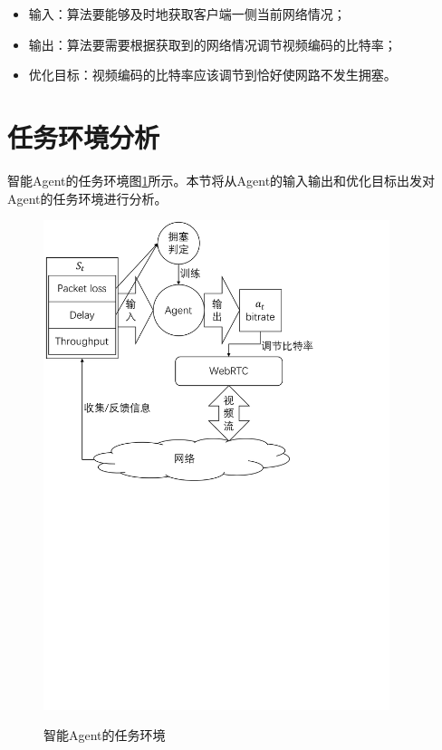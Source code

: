 \documentclass[a4paper]{ctexart}
\begin{document}
\begin{itemize}
	\item 输入：算法要能够及时地获取客户端一侧当前网络情况；
	\item 输出：算法要需要根据获取到的网络情况调节视频编码的比特率；
	\item 优化目标：视频编码的比特率应该调节到恰好使网路不发生拥塞。
\end{itemize}

\section{任务环境分析}

智能Agent的任务环境图\ref{figure:env}所示。本节将从Agent的输入输出和优化目标出发对Agent的任务环境进行分析。

\begin{figure}[htbp]
	\centering
	\includegraphics[width=0.9\textwidth, keepaspectratio]{figure/env.pdf}\\
	\caption{智能Agent的任务环境}\label{figure:env}
\end{figure}
\end{document}
